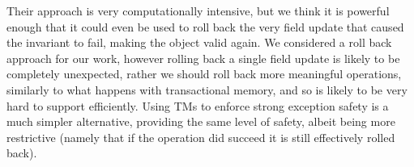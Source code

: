 Their approach is very computationally intensive, but we think it is powerful enough that it could even be used to roll back the very field update that caused the invariant to fail, making the object valid again.
We considered a roll back approach for our work, however rolling back a single field update is likely to be completely unexpected, rather we should roll back more meaningful operations, similarly to what happens
with transactional memory, and so is likely to be very hard to support efficiently.
Using TMs to enforce strong exception safety is a much simpler alternative, providing the same level of safety, albeit being more restrictive (namely that if the operation did succeed it is still effectively rolled back).



{}

